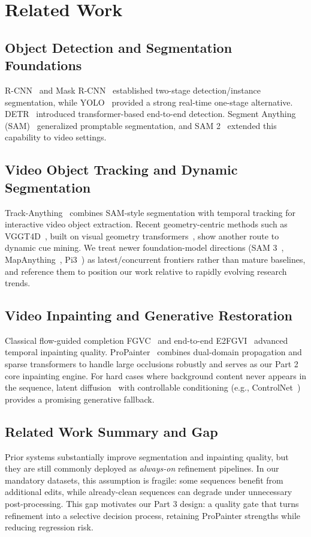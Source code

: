 \documentclass[10pt,twocolumn,letterpaper]{article}
\begin{document}
\section{Related Work}
\subsection{Object Detection and Segmentation Foundations}
R-CNN~\cite{girshick2014rcnn} and Mask R-CNN~\cite{he2017maskrcnn} established two-stage detection/instance segmentation, while YOLO~\cite{redmon2016yolo} provided a strong real-time one-stage alternative. DETR~\cite{carion2020detr} introduced transformer-based end-to-end detection. Segment Anything (SAM)~\cite{kirillov2023sam} generalized promptable segmentation, and SAM 2~\cite{ravi2024sam2} extended this capability to video settings.

\subsection{Video Object Tracking and Dynamic Segmentation}
Track-Anything~\cite{yang2023trackanything} combines SAM-style segmentation with temporal tracking for interactive video object extraction. Recent geometry-centric methods such as VGGT4D~\cite{hu2025vggt4d}, built on visual geometry transformers~\cite{wang2025vggt}, show another route to dynamic cue mining. We treat newer foundation-model directions (SAM 3~\cite{carion2025sam3}, MapAnything~\cite{keetha2025mapanything}, Pi3~\cite{wang2025pi3}) as latest/concurrent frontiers rather than mature baselines, and reference them to position our work relative to rapidly evolving research trends.

\subsection{Video Inpainting and Generative Restoration}
Classical flow-guided completion FGVC~\cite{gao2020fgvc} and end-to-end E2FGVI~\cite{li2022e2fgvi} advanced temporal inpainting quality. ProPainter~\cite{zhou2023propainter} combines dual-domain propagation and sparse transformers to handle large occlusions robustly and serves as our Part 2 core inpainting engine. For hard cases where background content never appears in the sequence, latent diffusion~\cite{rombach2022ldm} with controllable conditioning (e.g., ControlNet~\cite{zhang2023controlnet}) provides a promising generative fallback.

\subsection{Related Work Summary and Gap}
Prior systems substantially improve segmentation and inpainting quality, but they are still commonly deployed as \emph{always-on} refinement pipelines. In our mandatory datasets, this assumption is fragile: some sequences benefit from additional edits, while already-clean sequences can degrade under unnecessary post-processing. This gap motivates our Part 3 design: a quality gate that turns refinement into a selective decision process, retaining ProPainter strengths while reducing regression risk.
\end{document}
